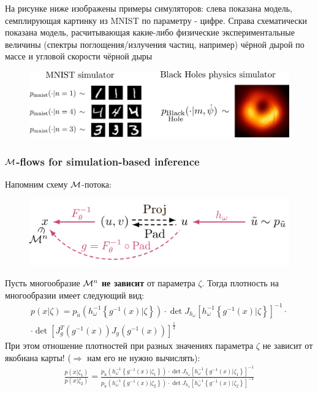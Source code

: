 \newpage

На рисунке ниже изображены примеры симуляторов: слева показана модель, семплирующая картинку из MNIST по параметру - цифре. Справа схематически показана модель, расчитывающая какие-либо физические экспериментальные величины (спектры поглощения/излучения частиц, например) чёрной дырой по массе и угловой скорости чёрной дыры 

\begin{figure}[h]
    \centering
    \includegraphics[width=0.7\linewidth]{chapters/petr_mokrov_s1/figs/simulators_demo.png}
\end{figure}

\subsubsection{$\mathcal{M}$-flows for simulation-based inference}

Напомним схему $\mathcal{M}$-потока: 
\begin{figure}[h]
    \centering
    \includegraphics[width=0.6\linewidth]{chapters/petr_mokrov_s1/figs/mflow_final.png}
\end{figure}

Пусть многообразие $\mathcal{M}^n$ \textbf{не зависит} от параметра $\zeta$. Тогда плотность на многообразии имеет следующий вид:
\begin{gather*}
    p(x| \zeta) = p_{\tilde{u}}(h_{\omega}^{-1}\left\{g^{-1}(x)| \zeta\right\}) \cdot \det J_{h_{\omega}}\left[h_{\omega}^{-1}\left\{g^{-1}(x)| \zeta\right\}\right]^{-1} \cdot \\ \cdot \det \left[ J_g^{T}(g^{-1}(x)) J_g(g^{-1}(x))\right]^{\frac{1}{2}}
\end{gather*}
При этом отношение плотностей при разных значениях параметра $\zeta$ не зависит от якобиана карты! ($\Rightarrow$ нам его не нужно вычислять):
\begin{gather*}
        \frac{p(x|\zeta_1)}{p(x|\zeta_2)} = \frac{p_{\tilde{u}}(h_{\omega}^{-1}\left\{g^{-1}(x)| \zeta_1\right\}) \cdot \det J_{h_{\omega}}\left[h_{\omega}^{-1}\left\{g^{-1}(x)| \zeta_1\right\}\right]^{-1}}{p_{\tilde{u}}(h_{\omega}^{-1}\left\{g^{-1}(x)| \zeta_2\right\}) \cdot \det J_{h_{\omega}}\left[h_{\omega}^{-1}\left\{g^{-1}(x)| \zeta_2\right\}\right]^{-1}}
\end{gather*}

